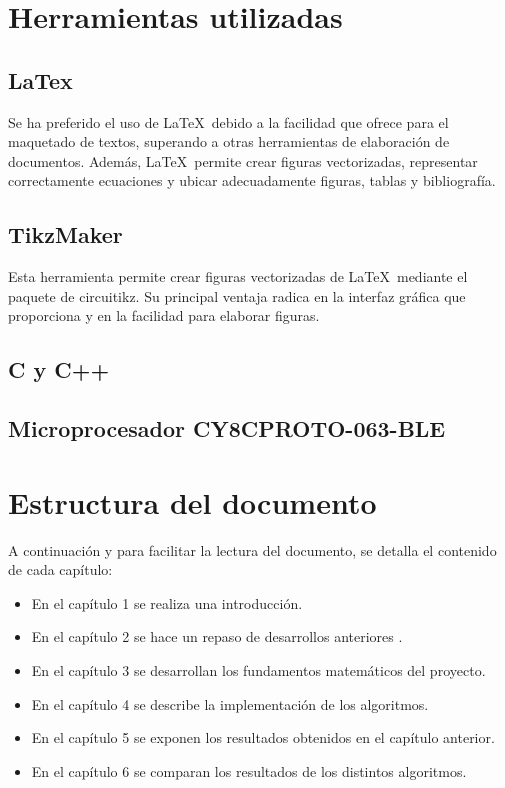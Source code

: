 \section{Herramientas utilizadas}
\subsection{LaTex \cite{latex}} 
Se ha preferido el uso de \LaTeX\ debido a la facilidad que ofrece para el maquetado de textos, superando a otras herramientas de elaboración de documentos. Además, \LaTeX\ permite crear figuras vectorizadas, representar correctamente ecuaciones y ubicar adecuadamente figuras, tablas y bibliografía.
\subsection{TikzMaker \cite{tikzmaker}} 
Esta herramienta permite crear figuras vectorizadas de \LaTeX\ mediante el paquete de circuitikz. Su principal ventaja radica en la interfaz gráfica que proporciona y en la facilidad para elaborar figuras.

\subsection{C y C++ }

\subsection{Microprocesador CY8CPROTO-063-BLE}

\section{Estructura del documento}
A continuación y para facilitar la lectura del documento, se detalla el contenido de cada capítulo:

\begin{itemize}
	\item En el capítulo 1 se realiza una introducción.
	\item En el capítulo 2 se hace un repaso de desarrollos anteriores .
	\item En el capítulo 3 se desarrollan los fundamentos matemáticos del proyecto.
	\item En el capítulo 4 se describe la implementación de los algoritmos.
	\item En el capítulo 5 se exponen los resultados obtenidos en el capítulo anterior. 
	\item En el capítulo 6 se comparan los resultados de los distintos algoritmos.
\end{itemize}